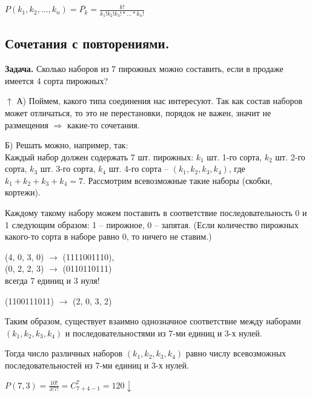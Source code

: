 \documentclass{article}
\begin{document}
    \(P(k_1, k_2, ..., k_n) = \overline{P_k} = \frac{k!}{k_1!k_2!k_3!*...*k_n!}\)

    \subsection{Сочетания с повторениями.}

    \textbf{Задача.} Сколько наборов из 7 пирожных можно составить, если в продаже имеется 4 сорта пирожных?

    \(\uparrow\) А) Поймем, какого типа соединения нас интересуют. Так как состав наборов может отличаться, то это не перестановки, порядок не важен, значит не размещения \(\Rightarrow\) какие-то сочетания.

    Б) Решать можно, например, так:
    \\Каждый набор должен содержать 7 шт. пирожных: \(k_1\) шт. 1-го сорта, \(k_2\) шт. 2-го сорта, \(k_3\) шт. 3-го сорта, \(k_4\) шт. 4-го сорта -- \((k_1, k_2, k_3, k_4)\), где \(k_1 + k_2 + k_3 + k_4 = 7\). 
    Рассмотрим всевозможные такие наборы (скобки, кортежи).

    Каждому такому набору можем поставить в соответствие последовательность 0 и 1 следующим образом: 1 -- пирожное, 0 -- запятая. (Если количество пирожных какого-то сорта в наборе равно 0, то ничего не ставим.)

    (4, 0, 3, 0) \(\rightarrow\) (1111001110),
    \\(0, 2, 2, 3) \(\rightarrow\) (0110110111)
    \\всегда 7 единиц и 3 нуля!

    (1100111011) \(\rightarrow\) (2, 0, 3, 2)

    Таким образом, существует взаимно однозначное соответствие между наборами \((k_1, k_2, k_3, k_4)\) и последовательностями из 7-ми единиц и 3-х нулей.

    Тогда число различных наборов \((k_1, k_2, k_3, k_4)\) равно числу всевозможных последовательностей из 7-ми единиц и 3-х нулей.

    \(P(7, 3) = \frac{10!}{3!7!} = C_{7+4-1}^7 = 120 \downarrow\)
\end{document}
